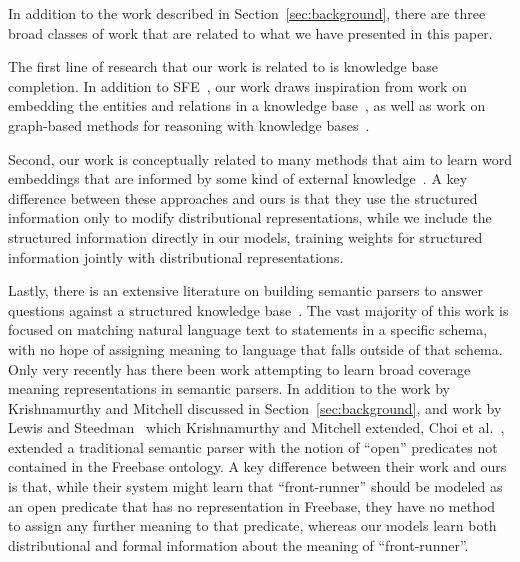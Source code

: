 \documentclass[11pt]{article}
\newcommand{\secref}[1]{Section~\ref{sec:#1}}
\begin{document}
In addition to the work described in \secref{background}, there are
three broad classes of work that are related to what we have presented
in this paper.

The first line of research that our work is related to is knowledge
base completion.  In addition to SFE~\cite{gardner-2015-sfe}, our work
draws inspiration from work on embedding the entities and relations in
a knowledge base~\cite{riedel-2013-mf-universal-schema,%
nickel-2011-rescal,bordes-2013-transe,nickel-2014-are,%
toutanova-2015-joint-text-kb-embedding}, as well as work on
graph-based methods for reasoning with knowledge
bases~\cite{lao-2010-original-pra,gardner-2014-vector-space-pra,%
neelakantan-2015-rnn-kbc}.

Second, our work is conceptually related to many methods that aim to
learn word embeddings that are informed by some kind of external
knowledge~\cite{faruqui-2015-retrofitting-word-vectors,%
rocktaschel-2015-logical-embeddings,schwartz-2016-symmetric-patterns-w2v,%
yu-2014-w2v-with-semantic-knowledge}.
A key difference between these approaches and ours is that they use
the structured information only to modify distributional
representations, while we include the structured information directly
in our models, training weights for structured information jointly
with distributional representations.

Lastly, there is an extensive literature on building semantic parsers
to answer questions against a structured knowledge
base~\cite{zettlemoyer-2005-ccg,berant-2013-semantic-parsing-qa,%
kwiatkowski-2013-ontology-matching,krishnamurthy-2012-semantic-parsing,%
li-2015-semantic-parsing-scfg}.  The vast majority of this work is
focused on matching natural language text to statements in a specific
schema, with no hope of assigning meaning to language that falls
outside of that schema.  Only very recently has there been work
attempting to learn broad coverage meaning representations in semantic
parsers.  In addition to the work by Krishnamurthy and Mitchell
discussed in \secref{background}, and work by Lewis and
Steedman~
which Krishnamurthy and Mitchell extended, Choi et
al.~,
extended a traditional semantic parser with the notion of ``open''
predicates not contained in the Freebase ontology.  A key difference
between their work and ours is that, while their system might learn
that ``front-runner'' should be modeled as an open predicate that has
no representation in Freebase, they have no method to assign any
further meaning to that predicate, whereas our models learn both
distributional and formal information about the meaning of
``front-runner''.
\end{document}
